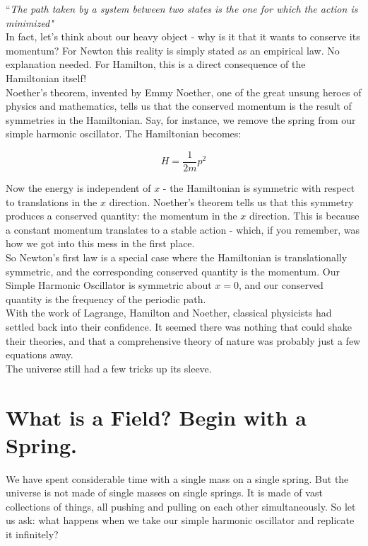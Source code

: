 \documentclass[krantz1,ChapterTOCs]{krantz}
\begin{document}
``\textit{The path taken by a system between two states is the one for which the action is minimized"}\\

In fact, let's think about our heavy object - why is it that it wants to conserve its momentum? For Newton this reality is simply stated as an empirical law. No explanation needed. For Hamilton, this is a direct consequence of the Hamiltonian itself!\\

Noether's theorem, invented by Emmy Noether, one of the great unsung heroes of physics and mathematics, tells us that the conserved momentum is the result of symmetries in the Hamiltonian. Say, for instance, we remove the spring from our simple harmonic oscillator. The Hamiltonian becomes:

$$H = \frac{1}{2m}p^2$$

Now the energy is independent of $x$ - the Hamiltonian is symmetric with respect to translations in the $x$ direction. Noether's theorem tells us that this symmetry produces a conserved quantity: the momentum in the $x$ direction. This is because a constant momentum translates to a stable action - which, if you remember, was how we got into this mess in the first place.\\

So Newton's first law is a special case where the Hamiltonian is translationally symmetric, and the corresponding conserved quantity is the momentum. Our Simple Harmonic Oscillator is symmetric about $x=0$, and our conserved quantity is the frequency of the periodic path.\\

With the work of Lagrange, Hamilton and Noether, classical physicists had settled back into their confidence. It seemed there was nothing that could shake their theories, and that a comprehensive theory of nature was probably just a few equations away.\\

The universe still had a few tricks up its sleeve.\\

\section*{What is a Field? Begin with a Spring.}

We have spent considerable time with a single mass on a single spring. 
But the universe is not made of single masses on single springs. It is 
made of vast collections of things, all pushing and pulling on each 
other simultaneously. So let us ask: what happens when we take our 
simple harmonic oscillator and replicate it infinitely?\\
\end{document}
